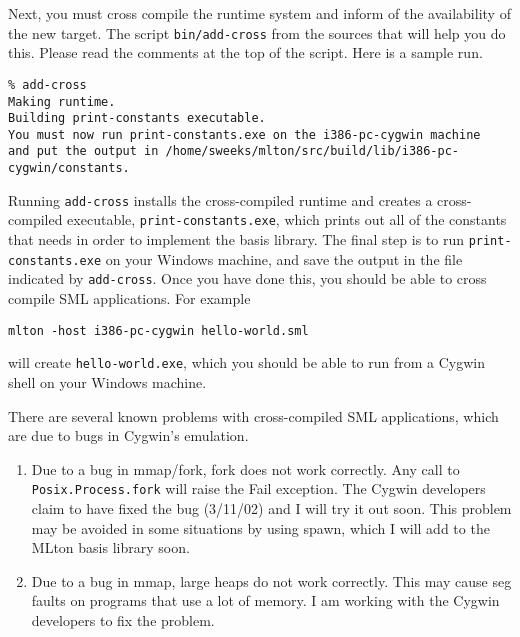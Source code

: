 Next, you must cross compile the {\mlton} runtime system and inform {\mlton} of
the availability of the new target.  The script {\tt bin/add-cross} from
the {\mlton} sources that will help you do this.  Please read the comments at
the top of the script.  Here is a sample run.
\begin{verbatim}
% add-cross
Making runtime.
Building print-constants executable.
You must now run print-constants.exe on the i386-pc-cygwin machine
and put the output in /home/sweeks/mlton/src/build/lib/i386-pc-cygwin/constants.
\end{verbatim}
Running {\tt add-cross} installs the cross-compiled runtime and creates a
cross-compiled executable, {\tt print-constants.exe}, which prints out all of
the constants that {\mlton} needs in order to implement the basis library.  The
final step is to run {\tt print-constants.exe} on your Windows machine, and save
the output in the file indicated by {\tt add-cross}.  Once you have done this,
you should be able to cross compile SML applications.  For example
\begin{verbatim}
mlton -host i386-pc-cygwin hello-world.sml
\end{verbatim}
will create {\tt hello-world.exe}, which you should be able to run from a Cygwin
shell on your Windows machine.


There are several known problems with cross-compiled SML applications, which are
due to bugs in Cygwin's emulation.

\begin{enumerate}

\item Due to a bug in mmap/fork, fork does not work correctly.  Any call to {\tt
Posix.Process.fork} will raise the Fail exception.  The Cygwin developers claim
to have fixed the bug (3/11/02) and I will try it out soon.  This problem may be
avoided in some situations by using spawn, which I will add to the MLton basis
library soon.

\item Due to a bug in mmap, large heaps do not work correctly.  This may
cause seg faults on programs that use a lot of memory.  I am working with the
Cygwin developers to fix the problem.

\end{enumerate}
